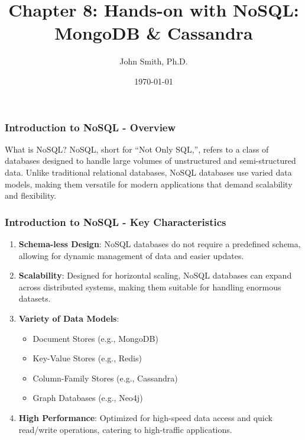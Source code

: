 \documentclass[aspectratio=169]{beamer}
\title[Hands-on with NoSQL]{Chapter 8: Hands-on with NoSQL: MongoDB \& Cassandra}
\author[J. Smith]{John Smith, Ph.D.}
\institute[University Name]{
  Department of Computer Science\\
  University Name\\
  \vspace{0.3cm}
  Email: email@university.edu\\
  Website: www.university.edu
}
\date{\today}
\begin{document}
\frame{\titlepage}

\begin{frame}[fragile]
    \frametitle{Introduction to NoSQL - Overview}
    \begin{block}{What is NoSQL?}
        NoSQL, short for ``Not Only SQL,'', refers to a class of databases designed to handle large volumes of unstructured and semi-structured data.
        Unlike traditional relational databases, NoSQL databases use varied data models, making them versatile for modern applications that demand scalability and flexibility.
    \end{block}
\end{frame}

\begin{frame}[fragile]
    \frametitle{Introduction to NoSQL - Key Characteristics}
    \begin{enumerate}
        \item \textbf{Schema-less Design}: NoSQL databases do not require a predefined schema, allowing for dynamic management of data and easier updates.
        
        \item \textbf{Scalability}: Designed for horizontal scaling, NoSQL databases can expand across distributed systems, making them suitable for handling enormous datasets.
        
        \item \textbf{Variety of Data Models}:
        \begin{itemize}
            \item Document Stores (e.g., MongoDB)
            \item Key-Value Stores (e.g., Redis)
            \item Column-Family Stores (e.g., Cassandra)
            \item Graph Databases (e.g., Neo4j)
        \end{itemize}
        
        \item \textbf{High Performance}: Optimized for high-speed data access and quick read/write operations, catering to high-traffic applications.
    \end{enumerate}
\end{frame}
\end{document}
